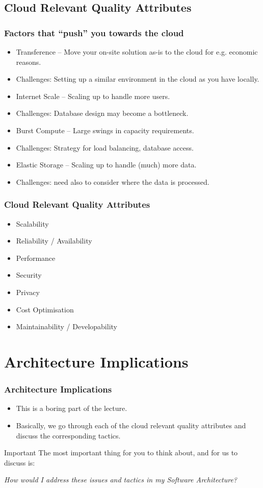 \documentclass[10pt]{beamer}
\def\subitem{\item[\hspace{1.5cm} -]}
\begin{document}
\subsection{Cloud Relevant Quality Attributes}

\begin{frame}[t]
\frametitle{Factors that ``push'' you towards the cloud}
\begin{itemize}
\item Transference -- Move your on-site solution as-is to the cloud for e.g. economic reasons.
\subitem Challenges: Setting up a similar environment in the cloud as you have locally.
\item Internet Scale -- Scaling up to handle more users.
\subitem Challenges: Database design may become a bottleneck.
\item Burst Compute -- Large swings in capacity requirements.
\subitem Challenges: Strategy for load balancing, database access.
\item Elastic Storage -- Scaling up to handle (much) more data.
\subitem Challenges: need also to consider where the data is processed.
\end{itemize}
\end{frame}


\begin{frame}[t]
\frametitle{Cloud Relevant Quality Attributes}

\begin{itemize}
\item Scalability
\item Reliability / Availability
\item Performance
\item Security
\item Privacy
\item Cost Optimisation
\item Maintainability / Developability
\end{itemize}

\end{frame}

\section{Architecture Implications}
\begin{frame}[t]
\frametitle{Architecture Implications}
\begin{itemize}
\item This is a boring part of the lecture.
\item Basically, we go through each of the cloud relevant quality attributes and discuss the corresponding tactics.
\end{itemize}

\begin{block}{Important}
The most important thing for you to think about, and for us to discuss is:

\vspace{0.5cm}
\emph{How would I address these issues and tactics in my Software Architecture?}
\end{block}

\end{frame}
\end{document}
